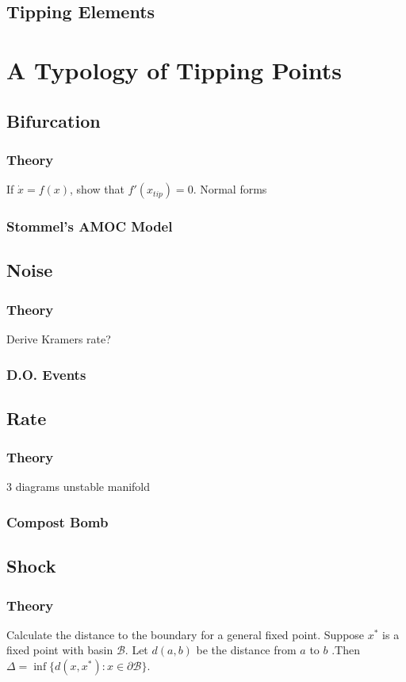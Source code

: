 \subsection{Tipping Elements}

\section{A Typology of Tipping Points}
\label{sec:tipping_typology}
\subsection{Bifurcation}
\subsubsection{Theory}
If $\dot{x} = f(x)$, show that $f'(x_{tip}) = 0$. Normal forms
\subsubsection{Stommel's AMOC Model}
\subsection{Noise}
\subsubsection{Theory}
Derive Kramers rate?
\subsubsection{D.O. Events}
\subsection{Rate}
\subsubsection{Theory}
3 diagrams unstable manifold
\subsubsection{Compost Bomb}
\subsection{Shock}
\subsubsection{Theory}
Calculate the distance to the boundary for a general fixed point. Suppose $x^*$ is a fixed point with basin $\mathcal{B}$. Let $d(a,b)$ be the distance from
$a$ to $b$ .Then $\Delta = \inf \{d(x,x^*) : x \in \partial\mathcal{B}\}$.

